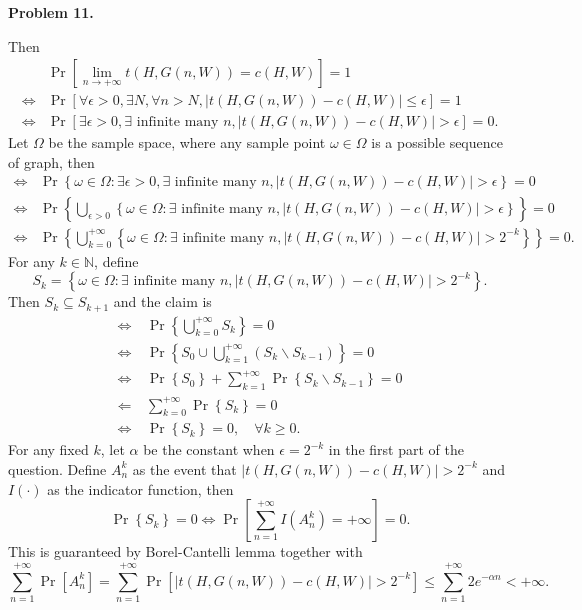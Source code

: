 \documentclass[a4paper]{article}
\newenvironment{problem}[1]{
	\par
	\noindent\textbf{Problem #1.}\quad
}{
	\par
	\bigskip
}
\newcommand{\abs}[1]{\left| #1 \right|}
\newcommand{\pbra}[1]{\left( #1 \right)}
\newcommand{\cbra}[1]{\left\{ #1 \right\}}
\newcommand{\sbra}[1]{\left[ #1 \right]}
\newcommand{\Nbb}{\mathbb{N}}
\begin{document}
\begin{problem}{11}
    Then 
    \begin{align*}
        &\Pr\sbra{\lim_{n\to+\infty}t(H,G(n,W))=c(H,W)}=1\\
        \iff&\Pr\sbra{\forall\epsilon>0,\exists N,\forall n>N,\abs{t(H,G(n,W))-c(H,W)}\leq\epsilon}=1\\
        \iff&\Pr\sbra{\exists\epsilon>0,\exists\text{ infinite many }n,\abs{t(H,G(n,W))-c(H,W)}>\epsilon}=0.
    \end{align*}
    Let $\Omega$ be the sample space, where any sample point $\omega\in\Omega$ is a possible sequence of graph, 
    then 
    \begin{align*}
        \iff&\Pr\cbra{\omega\in\Omega:
        \exists\epsilon>0,\exists\text{ infinite many }n,\abs{t(H,G(n,W))-c(H,W)}>\epsilon}=0\\
        \iff&\Pr\cbra{\bigcup_{\epsilon>0}\cbra{\omega\in\Omega:
        \exists\text{ infinite many }n,\abs{t(H,G(n,W))-c(H,W)}>\epsilon}}=0\\
        \iff&\Pr\cbra{\bigcup_{k=0}^{+\infty}\cbra{\omega\in\Omega:
        \exists\text{ infinite many }n,\abs{t(H,G(n,W))-c(H,W)}>2^{-k}}}=0.
    \end{align*}
    For any $k\in\Nbb$, define 
    $$
    S_k=\cbra{\omega\in\Omega:\exists\text{ infinite many }n,\abs{t(H,G(n,W))-c(H,W)}>2^{-k}}.
    $$
    Then $S_k\subseteq S_{k+1}$ and the claim is 
    \begin{align*}
        \iff&\Pr\cbra{\bigcup_{k=0}^{+\infty}S_k}=0\\
        \iff&\Pr\cbra{S_0\cup\bigcup_{k=1}^{+\infty}\pbra{S_k\backslash S_{k-1}}}=0\\
        \iff&\Pr\cbra{S_0}+\sum_{k=1}^{+\infty}\Pr\cbra{S_k\backslash S_{k-1}}=0\\
        \Longleftarrow\ &\sum_{k=0}^{+\infty}\Pr\cbra{S_k}=0\\
        \iff&\Pr\cbra{S_k}=0,\quad\forall k\geq0.
    \end{align*}
    For any fixed $k$, let $\alpha$ be the constant when $\epsilon=2^{-k}$ in the first part of the question.
    Define $A^k_n$ as the event that $\abs{t(H,G(n,W))-c(H,W)}>2^{-k}$ and $I(\cdot)$ as the indicator function, then
    $$
    \Pr\cbra{S_k}=0\iff\Pr\sbra{\sum_{n=1}^{+\infty}I\pbra{A_n^k}=+\infty}=0.
    $$
    This is guaranteed by Borel-Cantelli lemma together with 
    $$
    \sum_{n=1}^{+\infty}\Pr\sbra{A_n^k}=\sum_{n=1}^{+\infty}\Pr\sbra{\abs{t(H,G(n,W))-c(H,W)}>2^{-k}}
    \leq\sum_{n=1}^{+\infty}2e^{-\alpha n}<+\infty.
    $$

\end{problem}
\end{document}
